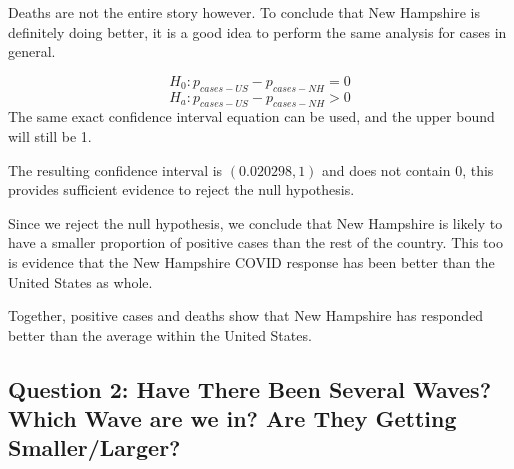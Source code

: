 \documentclass[
]{article}
\newenvironment{Shaded}{\begin{snugshade}}{\end{snugshade}}
\newcommand{\CommentTok}[1]{\textcolor[rgb]{0.56,0.35,0.01}{\textit{#1}}}
\newcommand{\DecValTok}[1]{\textcolor[rgb]{0.00,0.00,0.81}{#1}}
\newcommand{\FloatTok}[1]{\textcolor[rgb]{0.00,0.00,0.81}{#1}}
\newcommand{\KeywordTok}[1]{\textcolor[rgb]{0.13,0.29,0.53}{\textbf{#1}}}
\newcommand{\NormalTok}[1]{#1}
\newcommand{\OperatorTok}[1]{\textcolor[rgb]{0.81,0.36,0.00}{\textbf{#1}}}
\newcommand{\StringTok}[1]{\textcolor[rgb]{0.31,0.60,0.02}{#1}}
\begin{document}
Deaths are not the entire story however. To conclude that New Hampshire
is definitely doing better, it is a good idea to perform the same
analysis for cases in general.

\[H_{0}: p_{cases-US} - p_{cases-NH} = 0\]
\[H_{a}: p_{cases-US} - p_{cases-NH} > 0\] The same exact confidence
interval equation can be used, and the upper bound will still be 1.

\begin{Shaded}
\end{Shaded}

The resulting confidence interval is \((0.020298, 1)\) and does not
contain 0, this provides sufficient evidence to reject the null
hypothesis.

Since we reject the null hypothesis, we conclude that New Hampshire is
likely to have a smaller proportion of positive cases than the rest of
the country. This too is evidence that the New Hampshire COVID response
has been better than the United States as whole.

Together, positive cases and deaths show that New Hampshire has
responded better than the average within the United States.

\hypertarget{question-2-have-there-been-several-waves-which-wave-are-we-in-are-they-getting-smallerlarger}{%
\subsection{Question 2: Have There Been Several Waves? Which Wave are we
in? Are They Getting
Smaller/Larger?}\label{question-2-have-there-been-several-waves-which-wave-are-we-in-are-they-getting-smallerlarger}}
\end{document}
